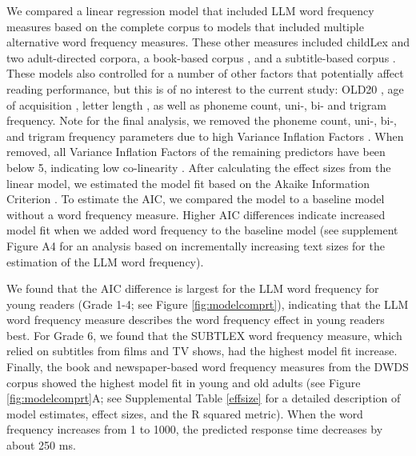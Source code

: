 \documentclass[doc, a4paper]{apa7}
\begin{document}
We compared a linear regression model that included LLM word frequency measures based on the complete corpus to models that included multiple alternative word frequency measures. These other measures included childLex and two adult-directed corpora, a book-based corpus \citep[DWDS][]{heister_dlexdb_2011}, and a subtitle-based corpus \citep[SUBTLEX][]{brysbaert_word_2011}. These models also controlled for a number of other factors that potentially affect reading performance, but this is of no interest to the current study: OLD20 \citep[e.g., ][]{yarkoni_moving_2008,hawelka_beyond_2013}, age of acquisition \citep[e.g., ][]{weekes_effects_2006}, letter length \citep[e.g., ][]{gagl_sources_2015, huestegge_oculomotor_2009, marinus_variability_2010, zoccolotti_word_2005}, as well as phoneme count, uni-, bi- and trigram frequency. Note for the final analysis, we removed the phoneme count, uni-, bi-, and trigram frequency parameters due to high Variance Inflation Factors \cite{fox_generalized_1992}. When removed, all Variance Inflation Factors of the remaining predictors have been below 5, indicating low co-linearity \citep[i.e., see][for a similar procedure]{gregorova_access_2023}. After calculating the effect sizes from the linear model, we estimated the model fit based on the Akaike Information Criterion \citep[AIC, ][]{akaike_new_1974}. To estimate the AIC, we compared the model to a baseline model without a word frequency measure. Higher AIC differences indicate increased model fit when we added word frequency to the baseline model (see supplement Figure A4 for an analysis based on incrementally increasing text sizes for the estimation of the LLM word frequency). 

We found that the AIC difference is largest for the LLM word frequency for young readers (Grade 1-4; see Figure \ref{fig:modelcomprt}), indicating that the LLM word frequency measure describes the word frequency effect in young readers best. For Grade 6, we found that the SUBTLEX word frequency measure, which relied on subtitles from films and TV shows, had the highest model fit increase. Finally, the book and newspaper-based word frequency measures from the DWDS corpus showed the highest model fit in young and old adults (see Figure \ref{fig:modelcomprt}A; see Supplemental Table \ref{effsize} for a detailed description of model estimates, effect sizes, and the R squared metric). When the word frequency increases from 1 to 1000, the predicted response time decreases by about 250 ms.
\end{document}
